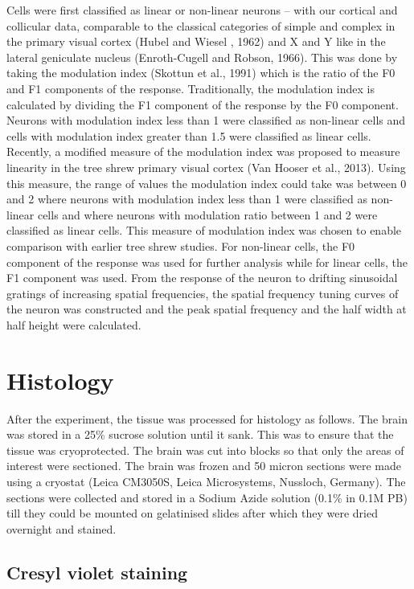 	Cells were first classified as linear or non-linear neurons – with our cortical and collicular data, comparable to the classical categories of simple and complex in the primary visual cortex (Hubel and Wiesel , 1962) and X and Y like in the lateral geniculate nucleus (Enroth-Cugell and Robson, 1966). This was done by taking the modulation index (Skottun et al., 1991) which is the ratio of the F0 and F1 components of the response. Traditionally, the modulation index is calculated by dividing the F1 component of the response by the F0 component. Neurons with modulation index less than 1 were classified as non-linear cells and cells with modulation index greater than 1.5 were classified as linear cells. Recently, a modified measure of the modulation index was proposed to measure linearity in the tree shrew primary visual cortex (Van Hooser et al., 2013). Using this measure, the range of values the modulation index could take was between 0 and 2 where neurons with modulation index less than 1 were classified as non-linear cells and where neurons with modulation ratio between 1 and 2 were classified as linear cells. This measure of modulation index was chosen to enable comparison with earlier tree shrew studies. For non-linear cells, the F0 component of the response was used for further analysis while for linear cells, the F1 component was used. From the response of the neuron to drifting sinusoidal gratings of increasing spatial frequencies, the spatial frequency tuning curves of the neuron was constructed and the peak spatial frequency and the half width at half height were calculated.
	
	\section{Histology}
	
	After the experiment, the tissue was processed for histology as follows. The brain was stored in a 25\% sucrose solution until it sank. This was to ensure that the tissue was cryoprotected. The brain was cut into blocks so that only the areas of interest were sectioned. The brain was frozen and 50 micron sections were made using a cryostat (Leica CM3050S, Leica Microsystems, Nussloch, Germany). The sections were collected and stored in a Sodium Azide solution (0.1\% in 0.1M PB) till they could be mounted on gelatinised slides after which they were dried overnight and stained.
	
	\subsection{Cresyl violet staining}
	
